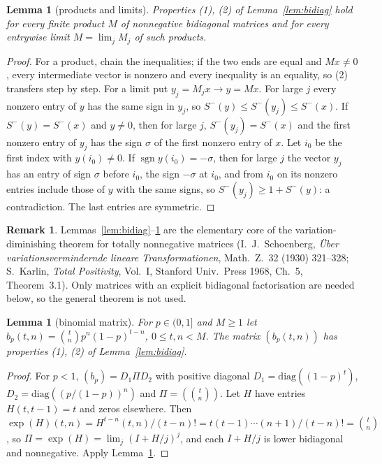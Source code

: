 \documentclass[11pt,a4paper]{article}
\newtheorem{lemma}[theorem]{Lemma}
\theoremstyle{definition}
\newtheorem*{remarku}{Remark}
\newcommand{\Sm}{S^{-}}
\newcommand{\sgn}{\operatorname{sgn}}
\begin{document}
\begin{lemma}[products and limits]\label{lem:prod}
Properties (1), (2) of Lemma~\ref{lem:bidiag} hold for every finite product $M$ of nonnegative bidiagonal matrices and for every entrywise limit $M=\lim_jM_j$ of such products.
\end{lemma}
\begin{proof}
For a product, chain the inequalities; if the two ends are equal and $Mx\neq0$, every intermediate vector is nonzero and every inequality is an equality, so (2) transfers step by step. For a limit put $y_j=M_jx\to y=Mx$. For large $j$ every nonzero entry of $y$ has the same sign in $y_j$, so $\Sm(y)\le\Sm(y_j)\le\Sm(x)$. If $\Sm(y)=\Sm(x)$ and $y\ne0$, then for large $j$, $\Sm(y_j)=\Sm(x)$ and the first nonzero entry of $y_j$ has the sign $\sigma$ of the first nonzero entry of $x$. Let $i_0$ be the first index with $y(i_0)\ne0$. If $\sgn y(i_0)=-\sigma$, then for large $j$ the vector $y_j$ has an entry of sign $\sigma$ before $i_0$, the sign $-\sigma$ at $i_0$, and from $i_0$ on its nonzero entries include those of $y$ with the same signs, so $\Sm(y_j)\ge1+\Sm(y)$: a contradiction. The last entries are symmetric.
\end{proof}

\begin{remarku}
Lemmas~\ref{lem:bidiag}--\ref{lem:prod} are the elementary core of the variation-diminishing theorem for totally nonnegative matrices (I.~J.~Schoenberg, \emph{\"Uber variationsvermindernde lineare Transformationen}, Math.\ Z.\ 32 (1930) 321--328; S.~Karlin, \emph{Total Positivity}, Vol.~I, Stanford Univ.\ Press 1968, Ch.~5, Theorem~3.1). Only matrices with an explicit bidiagonal factorisation are needed below, so the general theorem is not used.
\end{remarku}

\begin{lemma}[binomial matrix]\label{lem:binom}
For $p\in(0,1]$ and $M\ge1$ let $b_p(t,n)=\binom tn p^n(1-p)^{t-n}$, $0\le t,n<M$. The matrix $(b_p(t,n))$ has properties (1), (2) of Lemma~\ref{lem:bidiag}.
\end{lemma}
\begin{proof}
For $p<1$, $(b_p)=D_1\Pi D_2$ with positive diagonal $D_1=\mathrm{diag}((1-p)^t)$, $D_2=\mathrm{diag}((p/(1-p))^n)$ and $\Pi=(\binom tn)$. Let $H$ have entries $H(t,t-1)=t$ and zeros elsewhere. Then $\exp(H)(t,n)=H^{t-n}(t,n)/(t-n)!=t(t-1)\cdots(n+1)/(t-n)!=\binom tn$, so $\Pi=\exp(H)=\lim_j(I+H/j)^j$, and each $I+H/j$ is lower bidiagonal and nonnegative. Apply Lemma~\ref{lem:prod}.
\end{proof}
\end{document}
